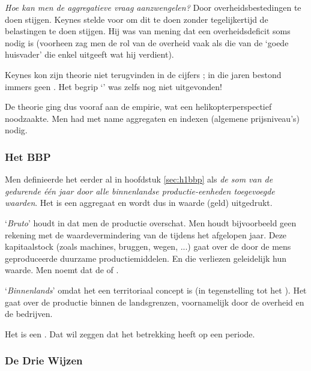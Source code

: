 \par \textit{Hoe kan men de aggregatieve vraag aanzwengelen?} Door overheidsbestedingen te doen stijgen. Keynes stelde voor om dit te doen zonder tegelijkertijd de belastingen te doen stijgen. Hij was van mening dat een overheidsdeficit soms nodig is (voorheen zag men de rol van de overheid vaak als die van de `goede huisvader' die enkel uitgeeft wat hij verdient).\\

\par Keynes kon zijn theorie niet terugvinden in de cijfers ; in die jaren bestond immers geen . Het begrip `' was zelfs nog niet uitgevonden! 
\par De theorie ging dus vooraf aan de empirie, wat een helikopterperspectief noodzaakte. Men had met name aggregaten en indexen (algemene prijsniveau's) nodig.

\subsubsection{Het BBP}

Men definieerde het  eerder al in hoofdstuk \ref{sec:h1bbp} als \textit{de som van de gedurende \'e\'en jaar door alle binnenlandse productie-eenheden toegevoegde waarden}. Het is een aggregaat en wordt dus in waarde (geld) uitgedrukt.
\par `\textit{Bruto}' houdt in dat men de productie overschat. Men houdt bijvoorbeeld geen rekening met de waardevermindering van de  tijdens het afgelopen jaar. Deze kapitaalstock (zoals machines, bruggen, wegen, ...) gaat over de door de mens geproduceerde duurzame productiemiddelen. En die verliezen geleidelijk hun waarde. Men noemt dat de  of .
\par `\textit{Binnenlands}' omdat het een territoriaal concept is (in tegenstelling tot het ). Het gaat over de productie binnen de landsgrenzen, voornamelijk door de overheid en de bedrijven.\\

\par Het  is een . Dat wil zeggen dat het betrekking heeft op een periode.

\subsubsection{De Drie Wijzen}

